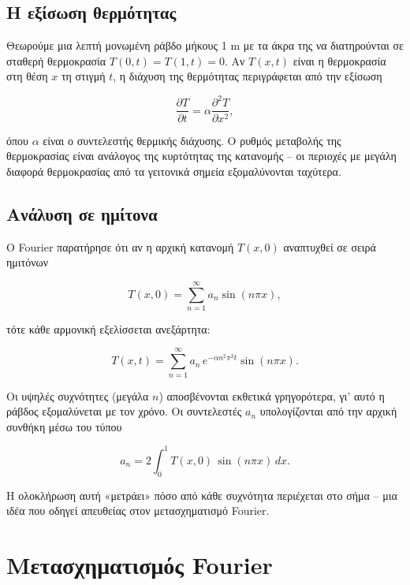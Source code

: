 \subsection{Η εξίσωση
θερμότητας}\label{ux3b7-ux3b5ux3beux3afux3c3ux3c9ux3c3ux3b7-ux3b8ux3b5ux3c1ux3bcux3ccux3c4ux3b7ux3c4ux3b1ux3c2}

Θεωρούμε μια λεπτή μονωμένη ράβδο μήκους 1 m με τα άκρα της να
διατηρούνται σε σταθερή θερμοκρασία \(T(0,t)=T(1,t)=0\). Αν \(T(x,t)\)
είναι η θερμοκρασία στη θέση \(x\) τη στιγμή \(t\), η διάχυση της
θερμότητας περιγράφεται από την εξίσωση

\[
\frac{\partial T}{\partial t} = \alpha \frac{\partial^2 T}{\partial x^2},
\]

όπου \(\alpha\) είναι ο συντελεστής θερμικής διάχυσης. Ο ρυθμός
μεταβολής της θερμοκρασίας είναι ανάλογος της κυρτότητας της κατανομής
-- οι περιοχές με μεγάλη διαφορά θερμοκρασίας από τα γειτονικά σημεία
εξομαλύνονται ταχύτερα.

\subsection{Ανάλυση σε
ημίτονα}\label{ux3b1ux3bdux3acux3bbux3c5ux3c3ux3b7-ux3c3ux3b5-ux3b7ux3bcux3afux3c4ux3bfux3bdux3b1}

Ο Fourier παρατήρησε ότι αν η αρχική κατανομή \(T(x,0)\) αναπτυχθεί σε
σειρά ημιτόνων

\[
T(x,0) = \sum_{n=1}^{\infty} a_n \sin(n\pi x),
\]

τότε κάθε αρμονική εξελίσσεται ανεξάρτητα:

\[
T(x,t) = \sum_{n=1}^{\infty} a_n \, e^{-\alpha n^2 \pi^2 t} \sin(n\pi x).
\]

Οι υψηλές συχνότητες (μεγάλα \(n\)) αποσβένονται εκθετικά γρηγορότερα,
γι' αυτό η ράβδος εξομαλύνεται με τον χρόνο. Οι συντελεστές \(a_n\)
υπολογίζονται από την αρχική συνθήκη μέσω του τύπου

\[
a_n = 2\int_0^1 T(x,0)\,\sin(n\pi x)\,dx.
\]

Η ολοκλήρωση αυτή «μετράει» πόσο από κάθε συχνότητα περιέχεται στο σήμα
-- μια ιδέα που οδηγεί απευθείας στον μετασχηματισμό Fourier.

\section{Μετασχηματισμός
Fourier}\label{ux3bcux3b5ux3c4ux3b1ux3c3ux3c7ux3b7ux3bcux3b1ux3c4ux3b9ux3c3ux3bcux3ccux3c2-fourier}

